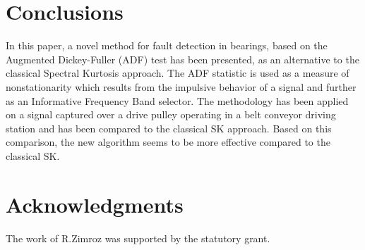 \documentclass[11pt]{article}
\begin{document}
\section{Conclusions}
In this paper, a novel method for fault detection in bearings, based on the Augmented Dickey-Fuller (ADF) test has been presented, as an alternative to the classical Spectral Kurtosis approach. The ADF statistic is used as a measure of nonstationarity which results from the impulsive behavior of a signal and further as an Informative Frequency Band selector. The methodology has been applied on a signal captured over a drive pulley operating in a belt conveyor driving station and has been compared to the classical SK approach. Based on this comparison, the new algorithm seems to be more effective compared to the classical SK. 





\section*{Acknowledgments}
The work of R.Zimroz was supported by the statutory grant.


\end{document}
